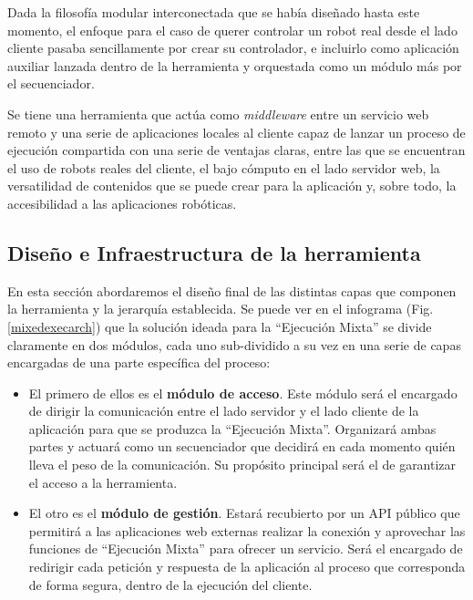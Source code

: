 Dada la filosofía modular interconectada que se había diseñado hasta este momento, el enfoque para el caso de querer controlar un robot real desde el lado cliente pasaba sencillamente por crear su controlador, e incluirlo como aplicación auxiliar lanzada dentro de la herramienta y orquestada como un módulo más por el secuenciador.

Se tiene una herramienta que actúa como \textit{middleware} entre un servicio web remoto y una serie de aplicaciones locales al cliente capaz de lanzar un proceso de ejecución compartida con una serie de ventajas claras, entre las que se encuentran el uso de robots reales del cliente, el bajo cómputo en el lado servidor web, la versatilidad de contenidos que se puede crear para la aplicación y, sobre todo, la accesibilidad a las aplicaciones robóticas.

\subsection{Diseño e Infraestructura de la herramienta}

En esta sección abordaremos el diseño final de las distintas capas que componen la herramienta y la jerarquía establecida. Se puede ver en el infograma (Fig. \ref{mixedexecarch}) que la solución ideada para la ``Ejecución Mixta'' se divide claramente en dos módulos, cada uno sub-dividido a su vez en una serie de capas encargadas de una parte específica del proceso:

\begin{itemize}
    \item [\textbullet] El primero de ellos es el \textbf{módulo de acceso}. Este módulo será el encargado de dirigir la comunicación entre el lado servidor y el lado cliente de la aplicación para que se produzca la ``Ejecución Mixta''. Organizará ambas partes y actuará como un secuenciador que decidirá en cada momento quién lleva el peso de la comunicación. Su propósito principal será el de garantizar el acceso a la herramienta.
    \item [\textbullet] El otro es el \textbf{módulo de gestión}. Estará recubierto por un API público que permitirá a las aplicaciones web externas realizar la conexión y aprovechar las funciones de ``Ejecución Mixta'' para ofrecer un servicio. Será el encargado de redirigir cada petición y respuesta de la aplicación al proceso que corresponda de forma segura, dentro de la ejecución del cliente.
\end{itemize}

